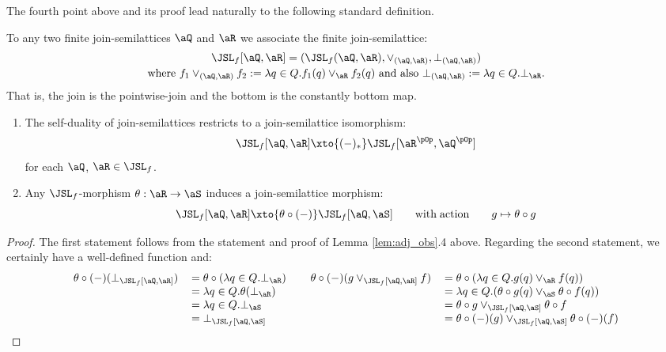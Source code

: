 \documentclass{article}
\begin{document}
The fourth point above and its proof lead naturally to the following standard definition.

\begin{definition}
\label{def:hom_functor_jsl}
To any two finite join-semilattices $\aQ$ and $\aR$ we associate the finite join-semilattice: \[
\begin{tabular}{c}
$\JSL_f[\aQ,\aR] = (\JSL_f(\aQ,\aR),\lor_{(\aQ,\aR)},\bot_{(\aQ,\aR)})$
\\[0.5ex]
where $f_1 \lor_{(\aQ,\aR)} f_2 := \lambda q \in Q. f_1(q) \lor_\aR f_2(q)$ and also $\bot_{(\aQ,\aR)} := \lambda q \in Q. \bot_\aR$.
\end{tabular}
\]
That is, the join is the pointwise-join and the bottom is the constantly bottom map. \endbox
\end{definition}

\begin{lemma}
\label{lem:jsl_mor_iso}
\item
\begin{enumerate}
\item
The self-duality of join-semilattices restricts to a join-semilattice isomorphism:
\[
\JSL_f[\aQ,\aR] \xto{(-)_*} \JSL_f[\aR^{\pOp},\aQ^{\pOp}]
\]
for each $\aQ$, $\aR \in \JSL_f$.
\item
Any $\JSL_f$-morphism $\theta : \aR \to \aS$ induces a join-semilattice morphism:
\[
\JSL_f[\aQ,\aR] \xto{\theta \circ (-)} \JSL_f[\aQ,\aS]
\qquad\mathrm{with\;action}\qquad
g \mapsto \theta \circ g
\]
\end{enumerate}
\end{lemma}

\begin{proof}
The first statement follows from the statement and proof of Lemma \ref{lem:adj_obs}.4 above. Regarding the second statement, we certainly have a well-defined function and:
\[
\begin{tabular}{llll}
$\theta \circ (-)(\bot_{\JSL_f[\aQ,\aR]})$
&
$= \theta \circ (\lambda q \in Q.\bot_\aR)$
&\quad
$\theta \circ (-)(g \lor_{\JSL_f[\aQ,\aR]} f)$
& $= \theta \circ (\lambda q \in Q. g(q) \lor_\aR f(q))$
\\&
$= \lambda q \in Q.\theta(\bot_\aR)$
&&
$= \lambda q \in Q. (\theta \circ g(q) \lor_\aS \theta \circ f(q))$
\\&
$= \lambda q \in Q. \bot_\aS$
&&
$= \theta \circ g \lor_{\JSL_f[\aQ,\aS]} \theta \circ f$
\\&
$= \bot_{\JSL_f[\aQ,\aS]}$
&&
$= \theta \circ (-)(g) \lor_{\JSL_f[\aQ,\aS]} \theta \circ (-)(f)$
\end{tabular}
\]
\end{proof}
\end{document}
